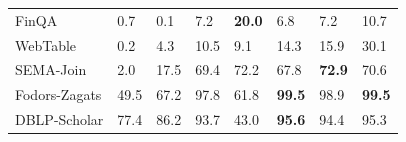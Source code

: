 \documentclass[11pt]{article}
\begin{document}
\begin{table}[t]
\begin{tabular}{llllllll}
   \midrule
FinQA            & 0.7                                                                  & 0.1                                                                  & 7.2                                                             & \textbf{20.0}                                                   & 6.8                                                             & 7.2                                                             & 10.7                                                            \\
WebTable         & 0.2                                                                  & 4.3                                                                  & 10.5                                                            & 9.1                                                             & 14.3                                                            & 15.9                                                            & 30.1                                                            \\
SEMA-Join        & 2.0                                                                  & 17.5                                                                 & 69.4                                                            & 72.2                                                            & 67.8                                                            & \textbf{72.9}                                                   & 70.6                                                            \\
Fodors-Zagats    & 49.5                                                                 & 67.2                                                                 & 97.8                                                            & 61.8                                                            & \textbf{99.5}                                                   & 98.9                                                            & \textbf{99.5}                                                   \\
DBLP-Scholar     & 77.4                                                                 & 86.2                                                                 & 93.7                                                            & 43.0                                                            & \textbf{95.6}                                                   & 94.4                                                            & 95.3                                                            \\

\end{tabular}
\end{table}
\end{document}
